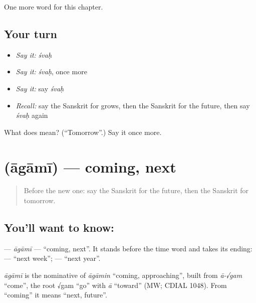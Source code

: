 \begin{grammarlens}[title={What you've built}]
One more word for this chapter.
\end{grammarlens}

\subsection*{Your turn}
\begin{itemize}
\raggedright
  \item \emph{Say it:} \emph{śvaḥ}
  \item \emph{Say it:} \emph{śvaḥ}, once more
  \item \emph{Say it:} say \emph{śvaḥ}
  \item \emph{Recall:} say the Sanskrit for grows, then the Sanskrit for the future, then say \emph{śvaḥ} again
\end{itemize}

\begin{tcolorbox}[breakable,colback=teal!4,colframe=teal!35!black,title={Before you move on}]
What does  mean? (\textquotedblleft{}Tomorrow\textquotedblright{}.) Say it once more.
\end{tcolorbox}
\section[\texorpdfstring{\sk{आगामी} (āgāmī)}{आगामी (āgāmī)}]{ (āgāmī) — coming, next}

\label{lesson:SA-C139-agami}



\begin{quote}
Before the new one: say the Sanskrit for the future, then the Sanskrit for tomorrow.
\end{quote}

\subsection*{You'll want to know: }
\textbf{} — \emph{āgāmī} — \textquotedblleft{}coming, next\textquotedblright{}. It stands before the time word and takes its ending: \textbf{ } — \textquotedblleft{}next week\textquotedblright{}; \textbf{ } — \textquotedblleft{}next year\textquotedblright{}.

\begin{cousinweb}
\emph{āgāmī} is the nominative of \emph{āgāmin} \textquotedblleft{}coming, approaching\textquotedblright{}, built from \emph{ā-√gam} \textquotedblleft{}come\textquotedblright{}, the root √gam \textquotedblleft{}go\textquotedblright{} with \emph{ā} \textquotedblleft{}toward\textquotedblright{} (MW; CDIAL 1048). From \textquotedblleft{}coming\textquotedblright{} it means \textquotedblleft{}next, future\textquotedblright{}.
\end{cousinweb}

